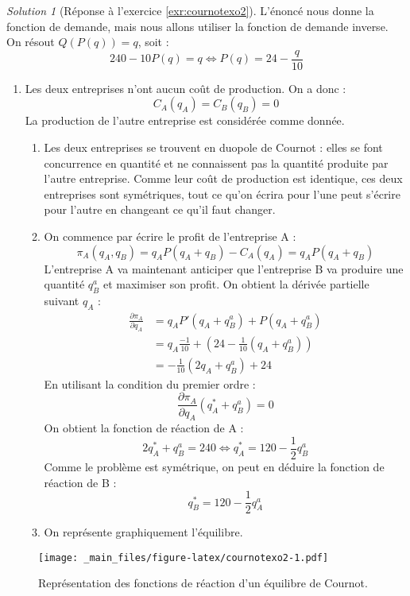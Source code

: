 \documentclass[
]{book}
\providecommand{\tightlist}{%
  \setlength{\itemsep}{0pt}\setlength{\parskip}{0pt}}
\theoremstyle{definition}
\theoremstyle{definition}
\theoremstyle{definition}
\theoremstyle{definition}
\theoremstyle{remark}
\newtheorem*{solution}{Solution}
\begin{document}
\begin{solution}[Réponse à l'exercice \ref{exr:cournotexo2}]
L'énoncé nous donne la fonction de demande, mais nous allons utiliser la fonction de demande inverse.
On résout \(Q(P(q))=q\), soit :
\[240-10P(q)=q\Leftrightarrow P(q)=24-\frac{q}{10}\]

\begin{enumerate}
\def\labelenumi{\arabic{enumi}.}
\tightlist
\item
  Les deux entreprises n'ont aucun coût de production.
  On a donc :
  \[C_{A}(q_A)=C_{B}(q_B)=0\]
  La production de l'autre entreprise est considérée comme donnée.

  \begin{enumerate}
  \def\labelenumii{\alph{enumii}.}
  \tightlist
  \item
    Les deux entreprises se trouvent en duopole de Cournot : elles se font concurrence en quantité et ne connaissent pas la quantité produite par l'autre entreprise.
    Comme leur coût de production est identique, ces deux entreprises sont symétriques, tout ce qu'on écrira pour l'une peut s'écrire pour l'autre en changeant ce qu'il faut changer.
  \item
    On commence par écrire le profit de l'entreprise A :
    \[\pi_A(q_A, q_B)=q_AP(q_A+q_B)-C_A(q_A)=q_AP(q_A+q_B)\]
    L'entreprise A va maintenant anticiper que l'entreprise B va produire une quantité \(q_B^a\) et maximiser son profit.
    On obtient la dérivée partielle suivant \(q_A\) :
    \begin{align*}
    \frac{\partial\pi_A}{\partial q_A}&=q_AP'(q_A+q_B^a)+P(q_A+q_B^a)\\
    &=q_A\frac{-1}{10}+(24-\frac{1}{10}(q_A+q_B^a))\\
    &=-\frac{1}{10}(2q_A+q_B^a)+24
    \end{align*}
    En utilisant la condition du premier ordre :
    \[\frac{\partial\pi_A}{\partial q_A}(q_A^*+q_B^a)=0\]
    On obtient la fonction de réaction de A :
    \[2q_A^*+q_B^a=240\Leftrightarrow q_A^*=120-\frac{1}{2}q_B^a\]
    Comme le problème est symétrique, on peut en déduire la fonction de réaction de B :
    \[q_B^*=120-\frac{1}{2}q_A^a\]
  \item
    On représente graphiquement l'équilibre.
  \end{enumerate}
\end{enumerate}

\begin{figure}
\centering
\texttt{[image: \_main\_files/figure-latex/cournotexo2-1.pdf]}
\caption{\label{fig:cournotexo2}Représentation des fonctions de réaction d'un équilibre de Cournot.}
\end{figure}


\end{solution}
\end{document}
